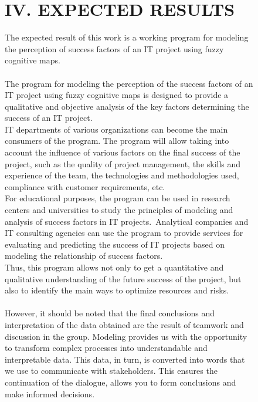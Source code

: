 \documentclass{article}
\begin{document}
    \begin{figure}[!t]
        \fontsize{8}{7}\selectfont
        \begin{minipage}{0.49\textwidth}
            \begin{center}
                \chapter{IV. EXPECTED RESULTS}
            \end{center}
            The expected result of this work is a working program for modeling the perception of success factors of an IT project using fuzzy cognitive maps.\\
            ~\\
            The program for modeling the perception of the success factors of an IT project using fuzzy cognitive maps is designed to provide a qualitative and objective analysis of the key factors determining the success of an IT project.
            \\ IT departments of various organizations can become the main consumers of the program. The program will allow taking into account the influence of various factors on the final success of the project, such as the quality of project management, the skills and experience of the team, the technologies and methodologies used, compliance with customer requirements, etc.\\
            For educational purposes, the program can be used in research centers and universities to study the principles of modeling and analysis of success factors in IT projects.\
            Analytical companies and IT consulting agencies can use the program to provide services for evaluating and predicting the success of IT projects based on modeling the relationship of success factors.
            ~\\
            Thus, this program allows not only to get a quantitative and qualitative understanding of the future success of the project, but also to identify the main ways to optimize resources and risks.\\
            ~\\
            However, it should be noted that the final conclusions and interpretation of the data obtained are the result of teamwork and discussion in the group. Modeling provides us with the opportunity to transform complex processes into understandable and interpretable data. This data, in turn, is converted into words that we use to communicate with stakeholders. This ensures the continuation of the dialogue, allows you to form conclusions and make informed decisions.\\

\end{minipage}
\end{figure}
\end{document}
